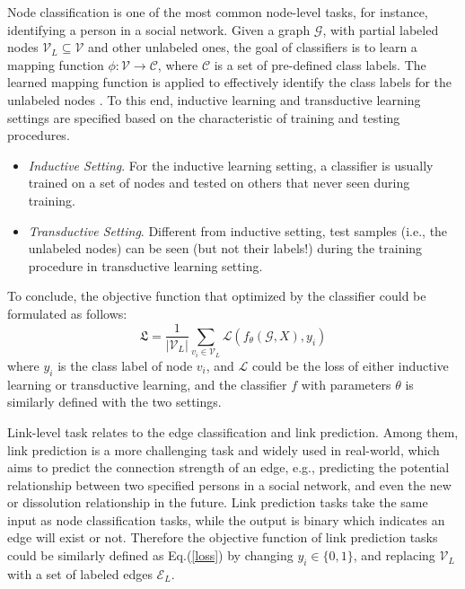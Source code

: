 Node classification is one of the most common node-level tasks, for instance, identifying a person in a social network. Given a graph $\mathcal{G}$, with partial labeled nodes $\mathcal{V}_L \subseteq \mathcal{V}$ and other unlabeled ones, the goal of classifiers is to learn a mapping function $\phi: \mathcal{V} \rightarrow \mathcal{C}$, where $\mathcal{C}$ is a set of pre-defined class labels. The learned mapping function is applied to effectively identify the class labels for the unlabeled nodes \cite{kipf2017semi}. To this end, inductive learning and transductive learning settings are specified based on the characteristic of training and testing procedures.
\begin{itemize}
	\item \emph{Inductive Setting}. For the inductive learning setting, a classifier is usually trained on a set of nodes and tested on others that never seen during training.
	\item \emph{Transductive Setting}. Different from inductive setting, test samples (i.e., the unlabeled nodes)  can be seen (but not their labels!) during the training procedure in transductive learning setting.
\end{itemize}
To conclude, the objective function that optimized by the classifier could be formulated as follows:
\begin{equation}
	\label{loss}
	\mathfrak{L}= \frac{1}{|\mathcal{V}_L|} \sum_{v_i \in \mathcal{V}_L}\mathcal{L}(f_{\theta} (\mathcal{G}, X), y_i)
\end{equation}
where $y_i$ is the class label of node $v_i$, and $\mathcal{L}$ could be the loss of either inductive learning or transductive learning, and the classifier $f$ with parameters $\theta$ is similarly defined with the two settings.


Link-level task relates to the edge classification and link prediction. Among them, link prediction is a more challenging task and widely used in real-world, which aims to predict the connection strength of an edge, e.g., predicting the potential relationship between two specified persons in a social network, and even the new or dissolution relationship in the future. Link prediction tasks take the same input as node classification tasks, while the output is binary which indicates an edge will exist or not. Therefore the objective function of link prediction tasks could be similarly defined as Eq.(\ref{loss}) by changing $y_i \in \{0,1\}$, and replacing $\mathcal{V}_L$ with a set of labeled edges $\mathcal{E}_L$.


